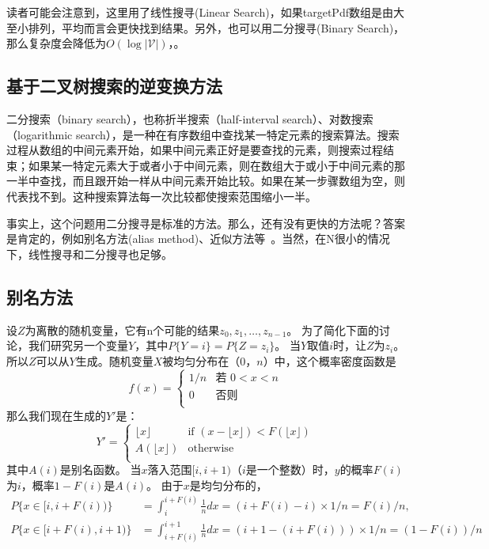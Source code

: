 读者可能会注意到，这里用了线性搜寻(Linear Search)，如果targetPdf数组是由大至小排列，平均而言会更快找到结果。另外，也可以用二分搜寻(Binary Search)，那么复杂度会降低为$O(\log |\mathcal{V}|)$，。


\subsection{基于二叉树搜索的逆变换方法}
二分搜索（binary search），也称折半搜索（half-interval search）、对数搜索（logarithmic search），是一种在有序数组中查找某一特定元素的搜索算法。搜索过程从数组的中间元素开始，如果中间元素正好是要查找的元素，则搜索过程结束；如果某一特定元素大于或者小于中间元素，则在数组大于或小于中间元素的那一半中查找，而且跟开始一样从中间元素开始比较。如果在某一步骤数组为空，则代表找不到。这种搜索算法每一次比较都使搜索范围缩小一半。

事实上，这个问题用二分搜寻是标准的方法。那么，还有没有更快的方法呢？答案是肯定的，例如别名方法(alias method)、近似方法等~。当然，在N很小的情况下，线性搜寻和二分搜寻也足够。
\subsection{别名方法}

设$ Z $为离散的随机变量，它有n个可能的结果$ z_0,z_1,\ldots,z_ {n-1} $。 为了简化下面的讨论，我们研究另一个变量$ Y $，其中$ P \{Y = i \} = P \{Z = z_i \} $。 当$ Y $取值$ i $时，让$ Z $为$ z_i $。 所以$ Z $可以从$ Y $生成。随机变量$ X $被均匀分布在$（0，n）$中，这个概率密度函数是
\begin{equation}\label{equ:alias}
 f(x) = \left\{
 \begin{array}{rl}
  1/n & \text{若 } 0 < x < n\\
  0 & \text{否则}\\
 \end{array} \right.
\end{equation}
那么我们现在生成的$Y'$是：
\begin{equation}\label{equ:gen}
  Y' =  \left\{
 \begin{array}{rl}
  \lfloor x  \rfloor & \text{if } (x - \lfloor x \rfloor) < F(\lfloor x \rfloor)\\
  A(\lfloor x \rfloor)  & \text{otherwise}\\
 \end{array} \right.
\end{equation}
其中$ A(i)$是别名函数。 当$ x $落入范围$ [i,i + 1)$（$ i $是一个整数）时，$ y $的概率$ F(i)$为$ i $，概率$ 1 - F(i )$是$ A(i)$。 由于$ x $是均匀分布的，
\begin{equation}
  \begin{split}
P\{x \in [i, i + F(i))\}     &= \int_i^{i+F(i)}\frac{1}{n}dx= (i + F(i) - i) \times 1/n= F(i)/n,\\
P\{x \in [i + F(i), i + 1)\} &= \int_{i+F(i)}^{i+1}\frac{1}{n}dx= (i + 1 - (i + F(i))) \times 1/n= (1-F(i))/n
\end{split}
\end{equation}

